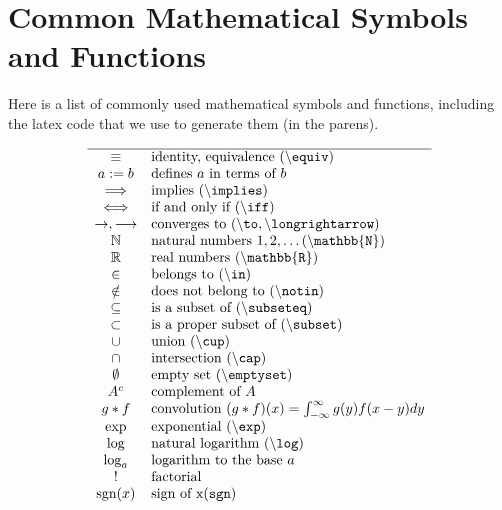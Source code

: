 \documentclass[
]{book}
\begin{document}
\hypertarget{S:Symbols}{%
\section{Common Mathematical Symbols and Functions}\label{S:Symbols}}

Here is a list of commonly used mathematical symbols and functions, including the latex code that we use to generate them (in the parens).

\[
\begin{array}{cl}
\hline
\equiv & \text{identity, equivalence }(\backslash\tt{equiv}) \\
a:=b   & \text{defines }a\text{ in terms of }b \\
\implies     & \text{implies }(\backslash\tt{implies})\\
\iff  & \text{if and only if }(\backslash\tt{iff})\\
\to, \longrightarrow & \text{converges to }(\backslash\tt{to}, \backslash\tt{longrightarrow}) \\
\mathbb{N} & \text{natural numbers }1,2,\ldots ( \backslash\tt{mathbb\{N\}}) \\
\mathbb{R} & \text{real numbers }(\backslash\tt{mathbb\{R\}})\\
\in        & \text{belongs to }(\backslash\tt{in}) \\
\notin     & \text{does not belong to }(\backslash\tt{notin}) \\
\subseteq  & \text{is a subset of }(\backslash\tt{subseteq}) \\
\subset    & \text{is a proper subset of }(\backslash\tt{subset}) \\
\cup       & \text{union  }(\backslash\tt{cup}) \\
\cap       & \text{intersection  }(\backslash\tt{cap}) \\
\emptyset  & \text{empty set }(\backslash\tt{emptyset})  \\
A^{c}      & \text{complement of }A   \\
g*f        & \text{convolution }(g*f)(x)=\int_{-\infty}^{\infty}g(y)f(x-y)dy \\
\exp       & \text{exponential }(\backslash\tt{exp}) \\
\log       & \text{natural logarithm }(\backslash\tt{log})\\
\log_a     & \text{logarithm to the base }a \\
!          & \text{factorial} \\
\text{sgn}(x)    & \text{sign of x}(\tt{sgn}) \\

\end{array}\]
\end{document}

